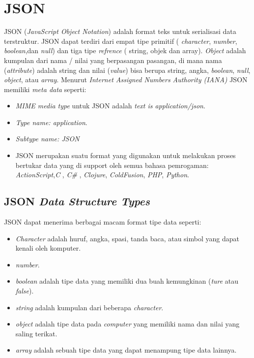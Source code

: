 \section{JSON}
\label{subsec:json}
JSON (\textit{JavaScript Object Notation}) adalah format teks untuk
   serialisasi data terstruktur. JSON dapat terdiri dari empat tipe primitif ( \textit{character}, \textit{number}, \textit{boolean},dan \textit{null}) dan tiga tipe \textit{refrence} ( string, objek dan array).\cite{RFC:7159}
\textit{Object} adalah kumpulan dari  nama / nilai yang
   berpasangan pasangan, di mana nama (\textit{attribute}) adalah string dan nilai (\textit{value}) bisa berupa string, angka,
   \textit{boolean}, \textit{null}, \textit{object}, atau \textit{array}. Menurut \textit{Internet Assigned Numbers Authority (IANA) } JSON memiliki \textit{meta data} seperti:\cite{Iana:01:JSON}
   \begin{itemize}
       \item  \textit{ MIME media type} untuk JSON adalah \textit{ text is application/json}.
       \item \textit{Type name:  application}.
       \item \textit{ Subtype name:  JSON}
       \item   JSON merupakan suatu format yang digunakan untuk melakukan proses bertukar data yang di support oleh semua bahasa pemrogaman: \textit{ActionScript},\textit{C} , \textit{C#} ,
      \textit{Clojure}, \textit{ColdFusion}, \textit{PHP}, \textit{Python}.
   \end{itemize}

\subsection{ JSON \textit{ Data Structure Types}}
JSON dapat menerima berbagai macam format tipe data seperti\cite{JSON:01:Datatypes}:
\begin{itemize}
    \item \textit{Character} adalah huruf, angka, spasi, tanda baca, atau simbol yang dapat kenali  oleh komputer.
    \item \textit{number}.
    \item \textit{boolean} adalah tipe data yang memiliki dua buah kemungkinan (\textit{ture} atau \textit{false}).
    \item \textit{string} adalah kumpulan dari beberapa \textit{character}.
    \item \textit{object} adalah tipe data pada \textit{computer} yang memiliki nama dan nilai yang saling terikat.
    \item \textit{array} adalah sebuah tipe data yang dapat menampung tipe data lainnya.
\end{itemize}


